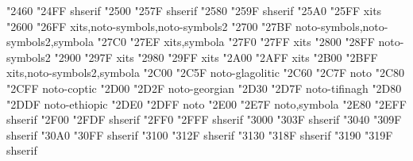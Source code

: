 \documentclass{article}
\begin{document}
                         {  "2460} {  "24FF} {shserif}
                                    {  "2500} {  "257F} {shserif}
                                 {  "2580} {  "259F} {shserif}
                               {  "25A0} {  "25FF} {xits}
                          {  "2600} {  "26FF} {xits,noto-symbols,noto-symbols2}
                                       {  "2700} {  "27BF} {noto-symbols,noto-symbols2,symbola}
           {  "27C0} {  "27EF} {xits,symbola}
                          {  "27F0} {  "27FF} {xits}
                               {  "2800} {  "28FF} {noto-symbols2}
                          {  "2900} {  "297F} {xits}
           {  "2980} {  "29FF} {xits}
            {  "2A00} {  "2AFF} {xits}
               {  "2B00} {  "2BFF} {xits,noto-symbols2,symbola}
                                     {  "2C00} {  "2C5F} {noto-glagolitic}
                               {  "2C60} {  "2C7F} {noto}
                                         {  "2C80} {  "2CFF} {noto-coptic}
                            {  "2D00} {  "2D2F} {noto-georgian}
                                       {  "2D30} {  "2D7F} {noto-tifinagh}
                              {  "2D80} {  "2DDF} {noto-ethiopic}
                            {  "2DE0} {  "2DFF} {noto}
                       {  "2E00} {  "2E7F} {noto,symbola}
                        {  "2E80} {  "2EFF} {shserif}
                                {  "2F00} {  "2FDF} {shserif}
             {  "2FF0} {  "2FFF} {shserif}
                    {  "3000} {  "303F} {shserif}
                                       {  "3040} {  "309F} {shserif}
                                       {  "30A0} {  "30FF} {shserif}
                                       {  "3100} {  "312F} {shserif}
                      {  "3130} {  "318F} {shserif}
                                         {  "3190} {  "319F} {shserif}
\end{document}
